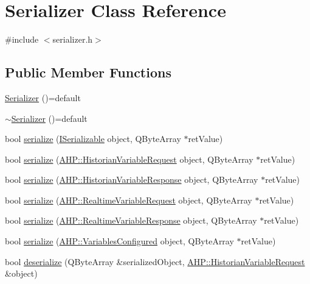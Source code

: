 \hypertarget{class_serializer}{}\section{Serializer Class Reference}
\label{class_serializer}


{\ttfamily \#include $<$serializer.\+h$>$}

\subsection*{Public Member Functions}
\begin{DoxyCompactItemize}
\item 
\hyperlink{class_serializer_ac45ad36ee8eb7f723bfbe58ee344ac47}{Serializer} ()=default
\item 
\hyperlink{class_serializer_ad8c6a8fc6ee5b163803e3d2dc9269e68}{$\sim$\+Serializer} ()=default
\item 
bool \hyperlink{class_serializer_a9d97b7db0e080432a452e7adce24a121}{serialize} (\hyperlink{class_i_serializable}{I\+Serializable} object, Q\+Byte\+Array $\ast$ret\+Value)
\item 
bool \hyperlink{class_serializer_a8703e8b51294faf0bb57459cd9fb52d4}{serialize} (\hyperlink{class_a_h_p_1_1_historian_variable_request}{A\+H\+P\+::\+Historian\+Variable\+Request} object, Q\+Byte\+Array $\ast$ret\+Value)
\item 
bool \hyperlink{class_serializer_a9ba4060dea840ff4bda7233d13d4d20f}{serialize} (\hyperlink{class_a_h_p_1_1_historian_variable_response}{A\+H\+P\+::\+Historian\+Variable\+Response} object, Q\+Byte\+Array $\ast$ret\+Value)
\item 
bool \hyperlink{class_serializer_a73a2208a74301dfac23cd60b0b06d0f9}{serialize} (\hyperlink{class_a_h_p_1_1_realtime_variable_request}{A\+H\+P\+::\+Realtime\+Variable\+Request} object, Q\+Byte\+Array $\ast$ret\+Value)
\item 
bool \hyperlink{class_serializer_ad586cb47dd0507a61dc62d0385216891}{serialize} (\hyperlink{class_a_h_p_1_1_realtime_variable_response}{A\+H\+P\+::\+Realtime\+Variable\+Response} object, Q\+Byte\+Array $\ast$ret\+Value)
\item 
bool \hyperlink{class_serializer_a4c19c84ea5c3ebe5833ee67e591c1ced}{serialize} (\hyperlink{class_a_h_p_1_1_variables_configured}{A\+H\+P\+::\+Variables\+Configured} object, Q\+Byte\+Array $\ast$ret\+Value)
\item 
bool \hyperlink{class_serializer_aa7ca49e1d68aa69800971a41ae7dfaa9}{deserialize} (Q\+Byte\+Array \&serialized\+Object, \hyperlink{class_a_h_p_1_1_historian_variable_request}{A\+H\+P\+::\+Historian\+Variable\+Request} \&object)

\end{DoxyCompactItemize}
